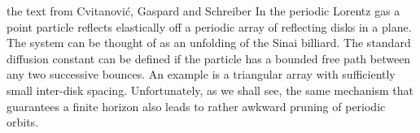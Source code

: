     {the text from Cvitanovi\'c, Gaspard and Schreiber}
In the periodic Lorentz gas
a point particle reflects elastically off
a periodic array of reflecting disks in a plane.
The system can
be thought of as an unfolding of the Sinai billiard.
The standard diffusion constant can be defined if the particle has a bounded
free path between any two successive bounces.
An example is a triangular array with sufficiently small
inter-disk spacing.
Unfortunately, as we shall see,
the same mechanism that guarantees a finite horizon
also leads to rather awkward pruning of periodic orbits.
